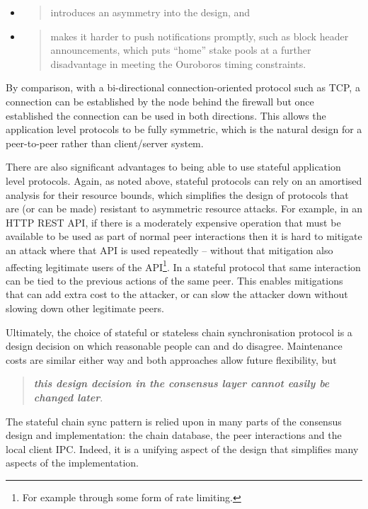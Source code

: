 \documentclass[11pt,a4paper]{article}
\begin{document}
\begin{itemize}
\item
  \begin{quote}
  introduces an asymmetry into the design, and
  \end{quote}
\item
  \begin{quote}
  makes it harder to push notifications promptly, such as block header
  announcements, which puts ``home'' stake pools at a further
  disadvantage in meeting the Ouroboros timing constraints.
  \end{quote}
\end{itemize}

By comparison, with a bi-directional connection-oriented protocol such
as TCP, a connection can be established by the node behind the firewall
but once established the connection can be used in both directions. This
allows the application level protocols to be fully symmetric, which is
the natural design for a peer-to-peer rather than client/server system.

There are also significant advantages to being able to use stateful
application level protocols. Again, as noted above, stateful protocols
can rely on an amortised analysis for their resource bounds, which
simplifies the design of protocols that are (or can be made) resistant
to asymmetric resource attacks. For example, in an HTTP REST API, if
there is a moderately expensive operation that must be available to be
used as part of normal peer interactions then it is hard to mitigate an
attack where that API is used repeatedly -- without that mitigation also
affecting legitimate users of the API\footnote{For example through some
  form of rate limiting.}. In a stateful protocol that same interaction
can be tied to the previous actions of the same peer. This enables
mitigations that can add extra cost to the attacker, or can slow the
attacker down without slowing down other legitimate peers.

Ultimately, the choice of stateful or stateless chain synchronisation
protocol is a design decision on which reasonable people can and do
disagree. Maintenance costs are similar either way and both approaches
allow future flexibility, but

\begin{quote}
\emph{\textbf{this design decision in the consensus layer cannot easily
be changed later}}.
\end{quote}

The stateful chain sync pattern is relied upon in many parts of the
consensus design and implementation: the chain database, the peer
interactions and the local client IPC. Indeed, it is a unifying aspect
of the design that simplifies many aspects of the implementation.
\end{document}
